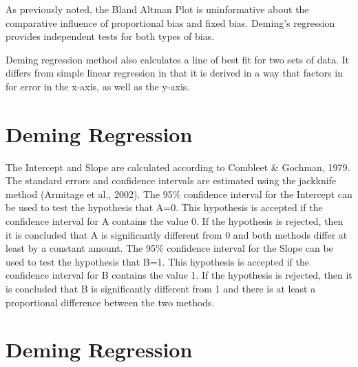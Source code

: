 \documentclass[12pt, a4paper]{report}
\theoremstyle{plain}
\theoremstyle{definition}
\theoremstyle{remark}
\begin{document}
As previously noted, the Bland Altman Plot is
uninformative about the comparative influence of proportional bias and fixed bias. Deming's regression provides independent tests for both types of bias.


Deming regression method also calculates a line of best fit for two sets of data. It differs from simple linear regression in that it is derived in a way that factors in for error in the x-axis, as well as the y-axis.


\section{Deming Regression}
The Intercept and Slope are calculated according to Combleet \& Gochman, 1979. The standard errors and confidence intervals are estimated using the jackknife method (Armitage et al., 2002).
The 95\% confidence interval for the Intercept can be used to test the hypothesis that A=0. This hypothesis is accepted if the confidence interval for A contains the value 0. If the hypothesis is rejected, then it is concluded that A is significantly different from 0 and both methods differ at least by a constant amount.
The 95\% confidence interval for the Slope can be used to test the hypothesis that B=1. This hypothesis is accepted if the confidence interval for B contains the value 1. If the hypothesis is rejected, then it is concluded that B is significantly different from 1 and there is at least a proportional difference between the two methods.



\section{Deming Regression}
\end{document}
